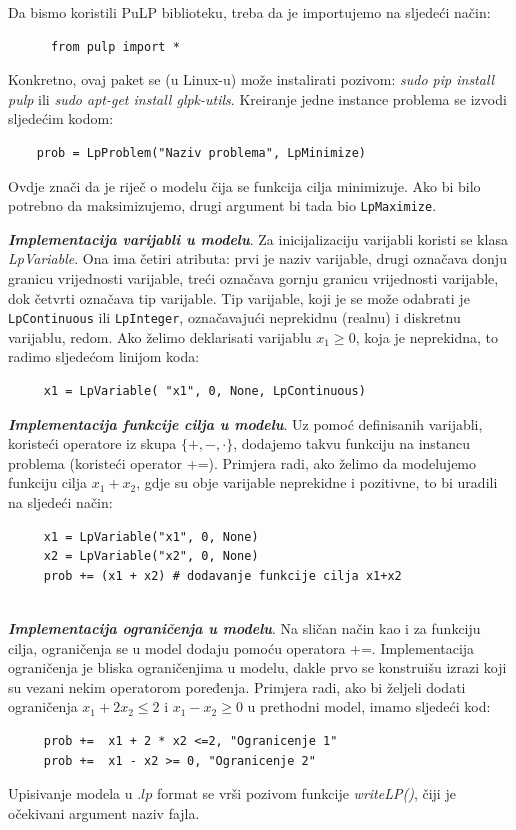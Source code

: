 \documentclass[a4paper, utf8, 11pt, colorlinks]{book}
\theoremstyle{definition}
\begin{document}
 Da bismo koristili PuLP biblioteku, treba da je importujemo na sljedeći način:
 \begin{verbatim}
 	  from pulp import *
 \end{verbatim}
 Konkretno, ovaj paket se (u Linux-u) može instalirati pozivom: \emph{sudo pip install pulp} ili \emph{sudo apt-get install glpk-utils}. 
 Kreiranje jedne instance problema se izvodi sljedećim kodom:
 \begin{verbatim}
 	prob = LpProblem("Naziv problema", LpMinimize)
 \end{verbatim}
Ovdje znači da je riječ o modelu čija se funkcija cilja minimizuje. Ako bi bilo potrebno da maksimizujemo, drugi argument bi tada bio \texttt{LpMaximize}. 

\textbf{\emph{Implementacija varijabli u modelu}}.  Za inicijalizaciju varijabli koristi se klasa \emph{LpVariable}. Ona ima četiri atributa: prvi je naziv varijable, drugi označava donju granicu vrijednosti varijable, treći označava gornju granicu vrijednosti varijable, dok četvrti označava tip varijable. Tip varijable, koji je se može odabrati je \texttt{LpContinuous} ili \texttt{LpInteger}, označavajući neprekidnu (realnu) i diskretnu varijablu, redom.  
Ako želimo deklarisati varijablu $x_1\geq 0$, koja je neprekidna, to radimo sljedećom linijom koda:
\begin{verbatim}
	 x1 = LpVariable( "x1", 0, None, LpContinuous)
\end{verbatim}
\textbf{\emph{Implementacija funkcije cilja u modelu}}. Uz pomoć definisanih varijabli, koristeći operatore iz skupa $\{+,-, \cdot \}$, dodajemo takvu funkciju na instancu problema (koristeći operator +=). Primjera radi, ako želimo da modelujemo funkciju cilja $x_1 + x_2$, gdje su obje varijable neprekidne i pozitivne, to bi uradili na sljedeći način:
\begin{verbatim}
	 x1 = LpVariable("x1", 0, None)
	 x2 = LpVariable("x2", 0, None) 
	 prob += (x1 + x2) # dodavanje funkcije cilja x1+x2 
\end{verbatim} \\ \vspace{-1.5cm}
\textbf{\emph{Implementacija ograničenja u modelu}}.  Na sličan način kao i za funkciju cilja, ograničenja se  u model dodaju pomoću operatora +=. Implementacija ograničenja je bliska ograničenjima u modelu, dakle prvo se konstruišu izrazi koji su vezani nekim operatorom poređenja. Primjera radi, ako bi željeli dodati ograničenja $x_1 + 2 x_2 \leq 2$ i $x_1-x_2 \geq 0$   u prethodni model, imamo sljedeći kod:
\begin{verbatim}
	 prob +=  x1 + 2 * x2 <=2, "Ogranicenje 1"
	 prob +=  x1 - x2 >= 0, "Ogranicenje 2" 
\end{verbatim}
Upisivanje modela u .$lp$ format se vrši pozivom funkcije \emph{writeLP()}, čiji je očekivani argument naziv fajla. 
\end{document}
